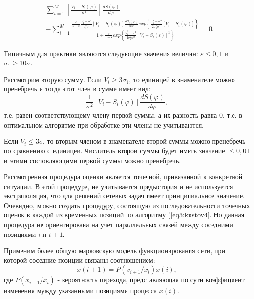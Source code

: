 \begin{equation}\label{eq3:kustov4}
\begin{split}
&\sum_{i=1}^M\left[\frac{V_i-S_i(\varphi)}{\sigma^2}\right]\frac{dS(\varphi)}{d\varphi}-\\
&-\sum_{i=1}^M\frac{\frac{\varepsilon}{1-\varepsilon}\frac{\sigma_1^2-\sigma^2}{\sigma_1^3\sigma}[V_i-S_i(\varphi)]\frac{dS_i(\varphi)}{d\varphi}exp\left\{\frac{\sigma_1^2-\sigma^2}{2\sigma_1^2\sigma^2}[V_i-S_i(\varphi)]\right\}}{1+\frac{\varepsilon}{1-\varepsilon}exp\left\{\frac{\sigma_1^2-\sigma^2}{2\sigma_1^2\sigma^2}[V_i-S_i(\varepsilon)]^2\right\}}=0.
\end{split}
\end{equation}

Типичным для практики являются следующие значения величин: $\varepsilon\leq0,1$ и $\sigma_1\geq10\sigma$.

Рассмотрим вторую сумму. Если $V_i\geq3\sigma_1$, то единицей в знаменателе можно пренебречь и тогда этот член в сумме имеет вид:
\begin{equation}\label{eq3:kustov5}
\frac{1}{\sigma^2}[V_i-S_i(\varphi)]\frac{dS(\varphi)}{d\varphi},
\end{equation}
\noindent т.е. равен соответствующему члену первой суммы, а их разность равна 0, т.е. в оптимальном алгоритме при обработке эти члены не учитываются.

Если $V_i\leq3\sigma$, то вторым членом в знаменателе второй суммы можно пренебречь по сравнению с единицей. Числитель второй суммы будет иметь значение $\leq0,01$ и этими состовляющими первой суммы можно пренебречь.

Рассмотренная процедура оценки является точечной, привязанной к конкретной ситуации. В этой процедуре, не учитывается предыстория и не используется экстраполяция, что для решений сетевых задач имеет принципиальное значение. 
Очевидно, можно создать процедуру, состоящую из последовательности точечных оценок в каждой из временных позиций по алгоритму (\ref{eq3:kustov4}.
Но данная процедура не ориентирована на учет параллельных связей между соседними позициями $i$ и $i+1$.

Применим более общую марковскую модель функционирования сети, при которой соседние позиции связаны соотношением:
\begin{equation}\label{eq3:kustov6}
x(i+1)=P(x_{i+1}/x_i)x(i),
\end{equation}
\noindent где $P(x_{i+1}/x_i)$ - вероятность перехода, представляющая по сути коэффициент изменения мужду указанными позициями процесса $x(i)$.

